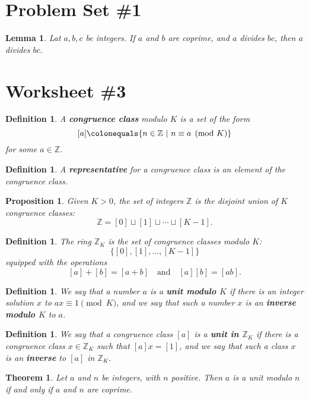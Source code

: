 \documentclass[12pt]{amsart}
\newcommand{\Z}{\mathbb{Z}}
\newcommand{\ceq}{\colonequals}
\numberwithin{equation}{section}
\theoremstyle{plain} %
\newtheorem{thm}	[section]	{Theorem}
\newtheorem{lem}	[section]	{Lemma}
\newtheorem{prop}	[section]	{Proposition}
\newtheorem{defn}	[section]	{Definition}
\begin{document}
\section*{Problem Set \#1}

\begin{lem} Lat $a,b,c$ be integers. If $a$ and $b$ are coprime, and $a$ divides $bc$, then $a$ divides $bc$.
\end{lem}

\section*{Worksheet \#3}

\begin{defn} A \textbf{congruence class} modulo $K$ is a set of the form
\[ [a] \ceq \{ n\in \Z \ | \ n\equiv a \pmod{K}\}\]
for some $a\in \Z$.
\end{defn} 

\begin{defn} A \textbf{representative} for a congruence class is an element of the congruence class.
\end{defn}

\begin{prop} Given $K>0$, the set of integers $\Z$ is the disjoint union of $K$ congruence classes:
\[  \Z = [0] \sqcup [1] \sqcup \cdots \sqcup [K-1]. \]
\end{prop}

\begin{defn} The ring $\Z_K$ is the set of congruence classes modulo $K$:
\[\{ [0] , [1], \ldots, [K-1]\}\] equipped with the operations
\[ [a] + [b] = [a+b] \quad\text{and}\quad [a][b] = [ab].\]
\end{defn}


\begin{defn} We say that a number $a$ is a \textbf{unit modulo $K$}  if there is an integer solution $x$ to $ax\equiv 1 \pmod{K}$, and we say that such a number $x$ is an \textbf{inverse modulo $K$} to $a$.
\end{defn}

\begin{defn} We say that a congruence class $[a]$ is a \textbf{unit in $\Z_K$} if there is a congruence class $x \in \Z_K$ such that $[a] x = [1]$, and we say that such a class $x$ is an \textbf{inverse} to $[a]$ in $\Z_K$.
\end{defn}

\begin{thm}
 Let $a$ and $n$ be integers, with $n$ positive. Then $a$ is a unit modulo $n$ if and only if $a$ and $n$ are coprime.
 \end{thm}
 
\end{document}
